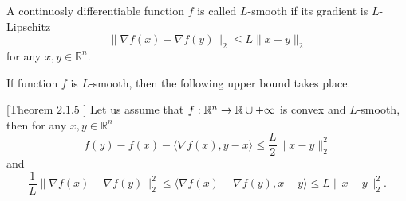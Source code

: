 \begin{definition}[$L$-smoothness]
A continuosly differentiable function $f$ is called $L$-smooth if its gradient is $L$-Lipschitz
\begin{equation}
    \|\nabla f(x) - \nabla f(y)\|_2\leq L\|x-y\|_2
\end{equation}
for any $x,y\in\mathbb{R}^n$.
\end{definition}

If function $f$ is $L$-smooth, then the following upper bound takes place.

\begin{lemma}\label{lm:descent}[Theorem $2.1.5$ \cite{nesterov-book}]
    Let us assume that $f:\mathbb{R}^n\rightarrow \mathbb{R}\cup{+\infty}$ is convex and $L$-smooth, then for any $x,y\in\mathbb{R}^n$
    \begin{equation}\label{eq:descent_lemma_1}
        f(y) - f(x) - \langle \nabla f(x), y-x\rangle\leq \frac{L}{2}\|x-y\|_2^2
    \end{equation}
    and
    \begin{equation}\label{eq:descent_lemma_2}
        \frac{1}{L}\|\nabla f(x) - \nabla f(y)\|_2^2 \leq\langle \nabla f(x) - \nabla f (y), x - y\rangle \leq L\|x-y\|_2^2.
    \end{equation}
\end{lemma}
